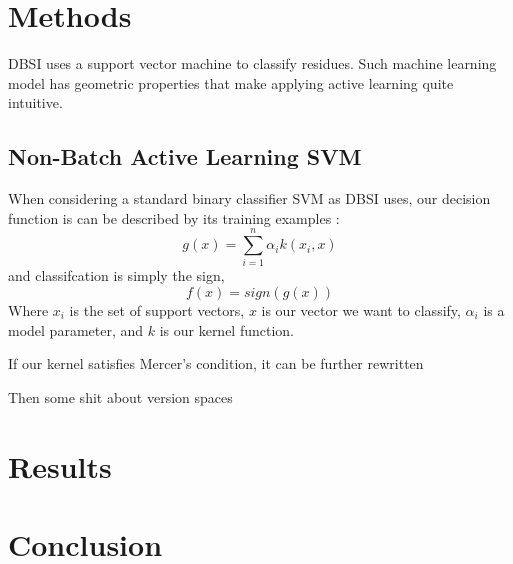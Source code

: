 \documentclass{article}
\begin{document}
     
\section*{Methods}
DBSI uses a support vector machine to classify residues. Such machine learning model has geometric properties that make applying active learning quite intuitive. 

\subsection*{Non-Batch Active Learning SVM}
When considering a standard binary classifier SVM as DBSI uses, our decision function is can be described by its training examples \cite{svm}:
\[
g(x) = \sum_{i=1}^{n} \alpha_i k( x_i, x)
\]
and classifcation is simply the sign,
\[
	f(x) = sign(g(x))
\]
Where $x_i$ is the set of support vectors,
$x$ is our vector we want to classify, $\alpha_i$ is a model parameter, and $k$ is our kernel function.

If our kernel satisfies Mercer's condition, it can be further rewritten \cite{active_learning}


Then some shit about version spaces
\cite{version_space}




\cite{active_learning}
\section*{Results}
\section*{Conclusion}

{}

\end{document}
